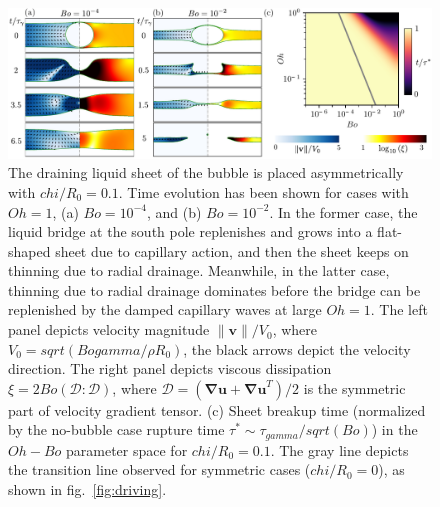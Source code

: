 \documentclass[reprint,amssymb,superscriptaddress,aps,prl,floatfix]{revtex4-2}
\def\chi{chi}%
\def\gamma{gamma}%
\def\sqrt#1{sqrt(#1)}%
\begin{document}
\begin{figure}
	\includegraphics{Oh-Bo-chi_04.pdf}
  \caption{\label{fig:asymmetry} The draining liquid sheet of the bubble is placed
  asymmetrically with $\chi/R_0 = 0.1$. Time evolution has been shown for cases with
$Oh=1$, (a) $Bo=10^{-4}$, and (b) $Bo=10^{-2}$. In the former case, the liquid bridge at
the south pole replenishes and grows into a flat-shaped sheet due to capillary action, and
then the sheet keeps on thinning due to radial drainage. Meanwhile, in the latter case,
thinning due to radial drainage dominates before the bridge can be replenished by the
damped capillary waves at large $Oh=1$. The left panel depicts velocity magnitude
$\|\boldsymbol{v}\|/V_0$, where $V_0 = \sqrt{Bo \gamma/\rho R_0}$, the black arrows depict
the velocity direction. The right panel depicts viscous dissipation $\xi = 2 Bo
\left(\boldsymbol{\mathcal{D}:\mathcal{D}}\right)$, where $\boldsymbol{\mathcal{D}} =
\left(\boldsymbol{\nabla u + \nabla u}^T\right)/2$ is the symmetric part of velocity
gradient tensor. (c) Sheet breakup time (normalized by the no-bubble case
rupture time $\tau^* \sim \tau_{\gamma} / \sqrt{Bo}$) in the $Oh-Bo$ parameter space for
$\chi/R_0 = 0.1$. The gray line depicts the transition line observed for symmetric cases
($\chi/R_0 = 0$), as shown in fig.~\ref{fig:driving}. }
\end{figure}
\end{document}
